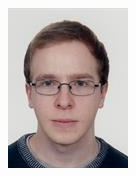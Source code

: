 \begin{minipage}{0.3\textwidth}\raggedright
	\includegraphics[width=\textwidth]{images/team/pscherler}
\end{minipage}

